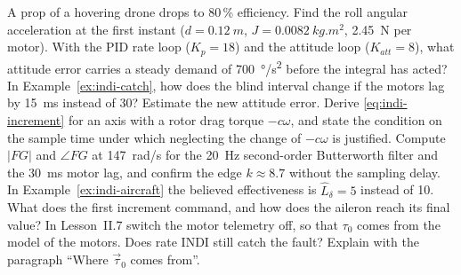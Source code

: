 \begin{exercises}
\exercise[1] A prop of a hovering drone drops to 80\,\% efficiency. Find the roll angular acceleration at the first instant ($d = \SI{0.12}{m}$, $J = \SI{0.0082}{kg.m^2}$, \SI{2.45}{N} per motor).
\exercise[1] With the PID rate loop ($K_p = 18$) and the attitude loop ($K_{att} = 8$), what attitude error carries a steady demand of \SI{700}{\degree/s^2} before the integral has acted?
\exercise[1] In Example~\ref{ex:indi-catch}, how does the blind interval change if the motors lag by \SI{15}{ms} instead of 30? Estimate the new attitude error.
\exercise[2] Derive \cref{eq:indi-increment} for an axis with a rotor drag torque $-c\omega$, and state the condition on the sample time under which neglecting the change of $-c\omega$ is justified.
\exercise[2] Compute $|FG|$ and $\angle FG$ at \SI{147}{rad/s} for the \SI{20}{Hz} second-order Butterworth filter and the \SI{30}{ms} motor lag, and confirm the edge $k \approx 8.7$ without the sampling delay.
\exercise[2] In Example~\ref{ex:indi-aircraft} the believed effectiveness is $\hat L_\delta = 5$ instead of 10. What does the first increment command, and how does the aileron reach its final value?
\exercise[2] In Lesson~II.7 switch the motor telemetry off, so that $\tau_0$ comes from the model of the motors. Does rate INDI still catch the fault? Explain with the paragraph \enquote{Where $\vec\tau_0$ comes from}.

\end{exercises}
